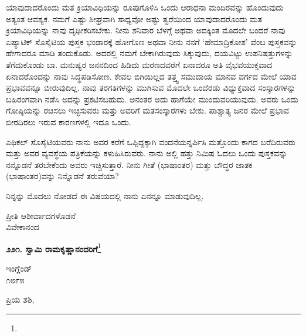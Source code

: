 \vspace{0.1cm}

ಯಾವುದಾದರೊಂದು ಮತ ಕ್ರಿಯಾವಿಧಿಯನ್ನು ರೂಪುಗೊಳಿಸಿ ಒಂದು ಆರಾಧನಾ ಮಂದಿರವನ್ನು ಹೊಂದುವುದು ಅತ್ಯಂತ ಆವಶ್ಯಕ. ನಮಗೆ ಎಷ್ಟು ಶೀಘ್ರವಾಗಿ ಸಾಧ್ಯವೋ ಅಷ್ಟು ತ್ವರೆಯಿಂದ ಯಾವುದಾದರೊಂದು ಮತ ಕ್ರಿಯಾವಿಧಿಯನ್ನು ನಾವು ದೃಢೀಕರಿಸಬೇಕು. ನೀನು ಶನಿವಾರ ಬೆಳಗ್ಗೆ ಅಥವಾ ಅದಕ್ಕಿಂತ ಮೊದಲೇ ಬಂದರೆ ನಾವು ಏಷ್ಯಾಟಿಕ್ ಸೊಸೈಟಿಯ ಪುಸ್ತಕ ಭಂಡಾರಕ್ಕೆ ಹೋಗೊಣ ಅಥವಾ ನೀನು ನನಗೆ ‘ಹೇಮಾದ್ರಿಕೋಶ’ ವೆಂಬ ಪುಸ್ತಕವನ್ನು ಹೇಗಾದರೂ ಮಾಡಿ ತಂದುಕೊಡು. ಅದರಲ್ಲಿ ನಮಗೆ ಬೇಕಾಗಿರುವುದು ಸಿಕ್ಕುವುದು, ದಯವಿಟ್ಟು ಉಪನಿಷತ್ತುಗಳನ್ನು ತೆಗೆದುಕೊಂಡು ಬಾ. ಮನುಷ್ಯರ ಜನನದಿಂದ ಹಿಡಿದು ಮರಣದವರೆಗೆ ಏನಾದರೂ ಅತಿ ವೈಭವಯುಕ್ತವಾದ ಏನಾದರೊಂದನ್ನು ನಾವು ಸಿದ್ಧಪಡಿಸೋಣ. ಕೇವಲ ಬಿಗಿಯಿಲ್ಲದ ತತ್ತ್ವ ಸಮುದಾಯ ಮಾನವ ವರ್ಗದ ಮೇಲೆ ಯಾವ ಪ್ರಭಾವವನ್ನೂ ಬೀರುವುದಿಲ್ಲ. ನಾವು ತರಗತಿಗಳನ್ನು ಮುಗಿಸುವ ಮೊದಲೇ ಒಂದೆರಡು ವಿಧ್ಯುಕ್ತವಾದ ಸಂಸ್ಕಾರಗಳನ್ನು ಬಹಿರಂಗವಾಗಿ ನಡೆಸಿ ಅದನ್ನು ಪ್ರಕಟಿಸಬಹುದು. ಅನಂತರ ಅದು ಹಾಗೆಯೇ ಮುಂದುವರಿಯುವುದು. ಅವರು ಒಂದು ಗೋಷ್ಠಿಯನ್ನು ರಚಿಸಲು ಇಚ್ಛಿಸುವರು ಮತ್ತು ಅವರಿಗೆ ಮತಸಂಸ್ಕಾರಗಳು ಬೇಕು. ಪಾಶ್ಚಾತ್ಯ ಜನರ ಮೇಲೆ ಪ್ರಭಾವ ಬೀರದಿರಲು ಇರುವ ಕಾರಣಗಳಲ್ಲಿ ಇದೂ ಒಂದು.

\vspace{0.1cm}

ಎಥಿಕಲ್ ಸೊಸೈಟಿಯವರು ನಾನು ಅವರ ಕರೆಗೆ ಒಪ್ಪಿದ್ದಕ್ಕಾಗಿ ವಂದನೆಯನ್ನರ್ಪಿಸಿ ಮತ್ತೊಂದು ಕಾಗದ ಬರೆದಿರುವರು ಮತ್ತು ಅವರ ವ್ಯವಸ್ಥೆಯ ಪತ್ರಿಕೆಯನ್ನು ಕಳುಹಿಸಿರುವರು. ನಾನು ಅಲ್ಲಿ ಹತ್ತು ನಿಮಿಷ ಓದಲು ಒಂದು ಪುಸ್ತಕವನ್ನು ನನ್ನೊಡನೆ ತರಬೇಕೆಂದು ಅವರು ಇಚ್ಚಿಸುತ್ತಾರೆ. ನೀನು ಗೀತೆ (ಭಾಷಾಂತರ) ಮತ್ತು ಬೌದ್ಧರ ಜಾತಕ (ಭಾಷಾಂತರ)ವನ್ನು ನಿನ್ನೊಡನೆ ತರುವೆಯಾ?

\vspace{0.1cm}

ನಿನ್ನನ್ನು ಮೊದಲು ನೋಡದೆ ಈ ವಿಷಯದಲ್ಲಿ ನಾನು ಏನನ್ನೂ ಮಾಡುವುದಿಲ್ಲ.
\vspace{-0.2cm}

{\flushright
ಪ್ರೀತಿ ಆಶೀರ್ವಾದಗಳೊಡನೆ\\ವಿವೇಕಾನಂದ\par}
\vspace{-0.3cm}

\begin{center}
\textbf{೨೨೧. ಸ್ವಾಮಿ ರಾಮಕೃಷ್ಣಾನಂದರಿಗೆ}\footnote{}
\end{center}
\vspace{-0.5cm}

\begin{flushright}
ಇಂಗ್ಲೆಂಡ್\\೧೮೯೫
\end{flushright}
\vspace{-0.3cm}

\noindent
ಪ್ರಿಯ ಶಶಿ,

